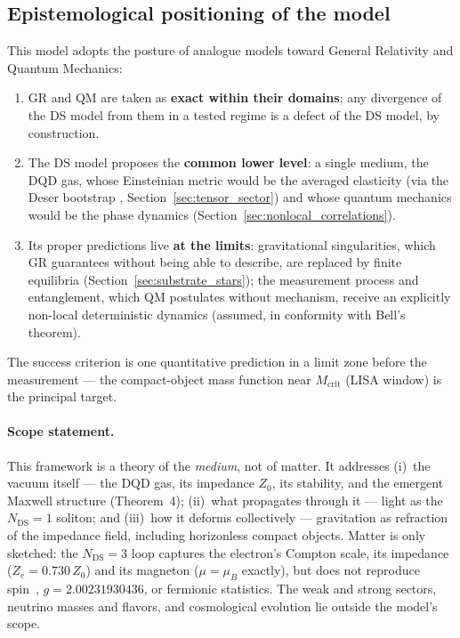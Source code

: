 \documentclass[11pt,a4paper]{article}
\theoremstyle{plain}
\theoremstyle{remark}
\newcommand{\Ncd}{\ensuremath{N_{\mathrm{DS}}}}
\begin{document}
\subsection*{Epistemological positioning of the model}
This model adopts the posture of analogue models \cite{barcelo, volovik} toward General Relativity and Quantum Mechanics:
\begin{enumerate}[label=(\roman*)]
    \item GR and QM are taken as \textbf{exact within their domains}; any divergence of the DS model from them in a tested regime is a defect of the DS model, by construction.
    \item The DS model proposes the \textbf{common lower level}: a single medium, the DQD gas, whose Einsteinian metric would be the averaged elasticity (via the Deser bootstrap \cite{deser1970}, Section~\ref{sec:tensor_sector}) and whose quantum mechanics would be the phase dynamics (Section~\ref{sec:nonlocal_correlations}).
    \item Its proper predictions live \textbf{at the limits}: gravitational singularities, which GR guarantees without being able to describe, are replaced by finite equilibria (Section~\ref{sec:substrate_stars}); the measurement process and entanglement, which QM postulates without mechanism, receive an explicitly non-local deterministic dynamics (assumed, in conformity with Bell's theorem).
\end{enumerate}
The success criterion is one quantitative prediction in a limit zone before the measurement --- the compact-object mass function near $M_{\text{crit}}$ (LISA window) is the principal target.

\paragraph{Scope statement.} This framework is a theory of the \emph{medium}, not of matter. It addresses (i)~the vacuum itself --- the DQD gas, its impedance $Z_0$, its stability, and the emergent Maxwell structure (Theorem~4); (ii)~what propagates through it --- light as the $\Ncd=1$ soliton; and (iii)~how it deforms collectively --- gravitation as refraction of the impedance field, including horizonless compact objects. Matter is only sketched: the $\Ncd=3$ loop captures the electron's Compton scale, its impedance ($Z_e = 0.730\,Z_0$) and its magneton ($\mu = \mu_B$ exactly), but does not reproduce spin~\textonehalf, $g = 2.00231930436$, or fermionic statistics. The weak and strong sectors, neutrino masses and flavors, and cosmological evolution lie outside the model's scope.
\end{document}

